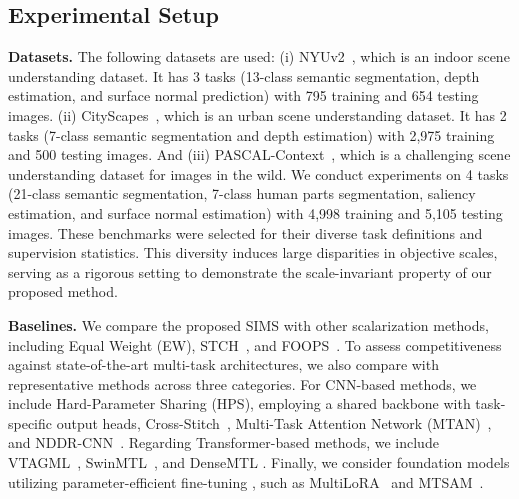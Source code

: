 \documentclass[sigconf]{acmart}
\begin{document}
\subsection{Experimental Setup}
\noindent \textbf{Datasets.}
The following datasets are used: (i) NYUv2~\cite{silberman2012indoor}, which is an indoor
scene understanding dataset. It has 3 tasks (13-class semantic segmentation, depth estimation, and
surface normal prediction) with 795 training and 654 testing images. 
(ii) CityScapes~\cite{cordts2016cityscapes}, which is an urban scene understanding dataset. It has 2 tasks (7-class semantic segmentation and depth estimation) with 2,975 training and 500 testing images.
And (iii) PASCAL-Context~\cite{everingham2010pascal}, which is a challenging scene understanding dataset for images in the wild. We conduct experiments on 4 tasks (21-class semantic segmentation, 7-class human parts segmentation, saliency estimation, and surface normal estimation) with 4,998 training and 5,105 testing images. These benchmarks were selected for their diverse task definitions and supervision statistics. This diversity induces large disparities in objective scales, serving as a rigorous setting to demonstrate the scale-invariant property of our proposed method.
\vspace{0.5\baselineskip}

\noindent \textbf{Baselines.}
We compare the proposed SIMS with other scalarization methods, including Equal Weight (EW), STCH~\cite{lin2024smooth}, and FOOPS~\cite{chen2025efficient}. To assess competitiveness against state-of-the-art multi-task architectures, we also compare with representative methods across three categories. For CNN-based methods, we include Hard-Parameter Sharing (HPS), employing a shared backbone with task-specific output heads, Cross-Stitch~\cite{misra2016cross}, Multi-Task Attention Network (MTAN)~\cite{liu2019end}, and NDDR-CNN~\cite{gao2019nddr}. Regarding Transformer-based methods, we include VTAGML~\cite{bhattacharjee2023vision}, SwinMTL~\cite{taghavi2024swinmtl}, and DenseMTL \cite{lopes2023cross}. Finally, we consider foundation models utilizing parameter-efficient fine-tuning  \cite{hu2022lora}, 
such as MultiLoRA~\cite{wang2023multilora} and MTSAM~\cite{wang2025mtsam}.
\vspace{0.5\baselineskip}
\end{document}
